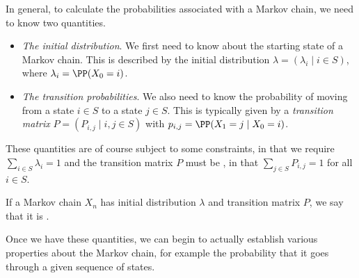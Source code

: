 \begin{center}
\end{center}

In general, to calculate the probabilities associated with a Markov chain, we need to know two quantities.

\begin{itemize}
	\item \emph{The initial distribution}. We first need to know about the starting state of a Markov chain. This is described by the initial distribution $\lambda = (\lambda_i \mid i \in S)$, where $\lambda_i = \PP(X_0 = i)$.
	\item \emph{The transition probabilities}. We also need to know the probability of moving from a state $i \in S$ to a state $j \in S$. This is typically given by a \emph{transition matrix} $P = (P_{i, j} \mid i, j \in S)$ with $p_{i,j} = \PP(X_1 = j \mid X_0 = i)$.
\end{itemize}
These quantities are of course subject to some constraints, in that we require $\sum_{i \in S} \lambda_i = 1$ and the transition matrix $P$ must be , in that $\sum_{j \in S} P_{i, j} = 1$ for all $i \in S$.

If a Markov chain $X_n$ has initial distribution $\lambda$ and transition matrix $P$, we say that it is .

Once we have these quantities, we can begin to actually establish various properties about the Markov chain, for example the probability that it goes through a given sequence of states.


